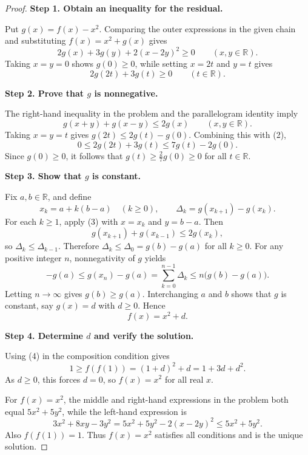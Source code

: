 
\begin{dlsummary}[title={\bfseries Solution 33. The Dyadic Parallelogram--Quadratic Squeeze},breakable]

\begin{proof}
\textbf{Step 1. Obtain an inequality for the residual.}

Put $g(x)=f(x)-x^2$. Comparing the outer expressions in the given chain
and substituting $f(x)=x^2+g(x)$ gives
\[
2g(x)+3g(y)+2(x-2y)^2\geq0
\qquad(x,y\in\mathbb R). \tag{1}
\]
Taking $x=y=0$ shows $g(0)\geq0$, while setting $x=2t$ and $y=t$ gives
\[
2g(2t)+3g(t)\geq0\qquad(t\in\mathbb R). \tag{2}
\]

\medskip
\noindent
\textbf{Step 2. Prove that $g$ is nonnegative.}

The right-hand inequality in the problem and the parallelogram identity
imply
\[
g(x+y)+g(x-y)\leq2g(x)
\qquad(x,y\in\mathbb R). \tag{3}
\]
Taking $x=y=t$ gives $g(2t)\leq2g(t)-g(0)$. Combining this with (2),
\[
0\leq2g(2t)+3g(t)\leq7g(t)-2g(0).
\]
Since $g(0)\geq0$, it follows that $g(t)\geq\frac27g(0)\geq0$ for
all $t\in\mathbb R$.

\medskip
\noindent
\textbf{Step 3. Show that $g$ is constant.}

Fix $a,b\in\mathbb R$, and define
\[
x_k=a+k(b-a)\quad(k\geq0),
\qquad
\Delta_k=g(x_{k+1})-g(x_k).
\]
For each $k\geq1$, apply (3) with $x=x_k$ and $y=b-a$. Then
\[
g(x_{k+1})+g(x_{k-1})\leq2g(x_k),
\]
so $\Delta_k\leq\Delta_{k-1}$. Therefore
$\Delta_k\leq\Delta_0=g(b)-g(a)$ for all $k\geq0$. For any positive
integer $n$, nonnegativity of $g$ yields
\[
-g(a)\leq g(x_n)-g(a)
=\sum_{k=0}^{n-1}\Delta_k
\leq n\bigl(g(b)-g(a)\bigr).
\]
Letting $n\to\infty$ gives $g(b)\geq g(a)$. Interchanging $a$ and $b$
shows that $g$ is constant, say $g(x)=d$ with $d\geq0$. Hence
\[
f(x)=x^2+d. \tag{4}
\]

\medskip
\noindent
\textbf{Step 4. Determine $d$ and verify the solution.}

Using (4) in the composition condition gives
\[
1\geq f(f(1))=(1+d)^2+d=1+3d+d^2.
\]
As $d\geq0$, this forces $d=0$, so $f(x)=x^2$ for all real $x$.

For $f(x)=x^2$, the middle and right-hand expressions in the problem
both equal $5x^2+5y^2$, while the left-hand expression is
\[
3x^2+8xy-3y^2=5x^2+5y^2-2(x-2y)^2
\leq5x^2+5y^2.
\]
Also $f(f(1))=1$. Thus $f(x)=x^2$ satisfies all conditions and is the
unique solution.
\end{proof}

\end{dlsummary}
